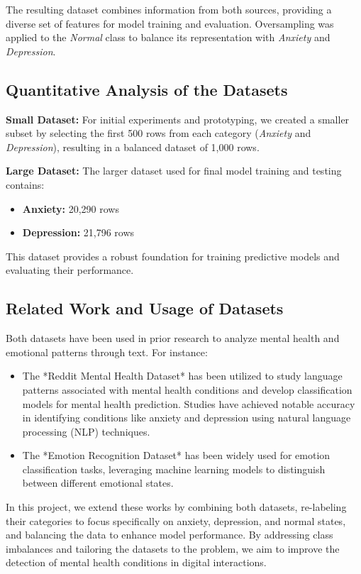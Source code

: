 \documentclass[runningheads,a4paper,11pt]{report}
\begin{document}
The resulting dataset combines information from both sources, providing a diverse set of features for model training and evaluation. Oversampling was applied to the \textit{Normal} class to balance its representation with \textit{Anxiety} and \textit{Depression}.

\subsection{Quantitative Analysis of the Datasets}
\label{section:analysis}

\textbf{Small Dataset:} For initial experiments and prototyping, we created a smaller subset by selecting the first 500 rows from each category (\textit{Anxiety} and \textit{Depression}), resulting in a balanced dataset of 1,000 rows.

\textbf{Large Dataset:} The larger dataset used for final model training and testing contains:
\begin{itemize}
    \item \textbf{Anxiety:} 20,290 rows
    \item \textbf{Depression:} 21,796 rows
\end{itemize}
This dataset provides a robust foundation for training predictive models and evaluating their performance.

\subsection{Related Work and Usage of Datasets}
\label{section:usage}
Both datasets have been used in prior research to analyze mental health and emotional patterns through text. For instance:
\begin{itemize}
    \item The *Reddit Mental Health Dataset* has been utilized to study language patterns associated with mental health conditions and develop classification models for mental health prediction. Studies have achieved notable accuracy in identifying conditions like anxiety and depression using natural language processing (NLP) techniques.
    \item The *Emotion Recognition Dataset* has been widely used for emotion classification tasks, leveraging machine learning models to distinguish between different emotional states.
\end{itemize}

In this project, we extend these works by combining both datasets, re-labeling their categories to focus specifically on anxiety, depression, and normal states, and balancing the data to enhance model performance. By addressing class imbalances and tailoring the datasets to the problem, we aim to improve the detection of mental health conditions in digital interactions.
\end{document}
